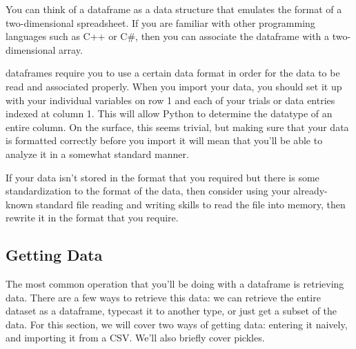 You can think of a dataframe as a data structure that emulates the format of a two-dimensional spreadsheet. If you are familiar with other programming languages such as C++ or C\#, then you can associate the dataframe with a two-dimensional array.\par
{} dataframes require you to use a certain data format in order for the data to be read and associated properly. When you import your data, you should set it up with your individual variables on row 1 and each of your trials or data entries indexed at column 1. This will allow Python to determine the datatype of an entire column. On the surface, this seems trivial, but making sure that your data is formatted correctly before you import it will mean that you'll be able to analyze it in a somewhat standard manner.\par
If your data isn't stored in the format that you required but there is some standardization to the format of the data, then consider using your already-known standard file reading and writing skills to read the file into memory, then rewrite it in the format that you require.\par
\subsection{Getting Data}
The most common operation that you'll be doing with a  dataframe is retrieving data. There are a few ways to retrieve this data: we can retrieve the entire dataset as a dataframe, typecast it to another type, or just get a subset of the data. For this section, we will cover two ways of getting data: entering it naively, and importing it from a CSV. We'll also briefly cover pickles.
